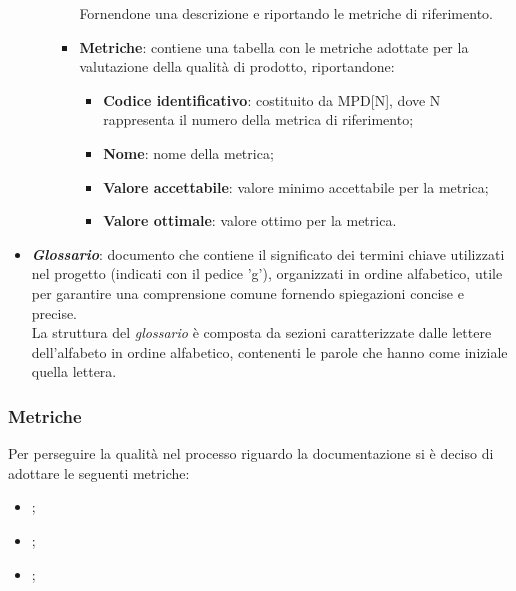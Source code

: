 \begin{itemize}
\begin{itemize}
\begin{itemize}
\begin{itemize}
                                                        \end{itemize}
                                                        Fornendone una descrizione e riportando le metriche di riferimento.
                                                        \item \textbf{Metriche}: contiene una tabella con le metriche adottate per la valutazione della qualità di prodotto, riportandone:
                                                        \begin{itemize}
                                                            \item \textbf{Codice identificativo}: costituito da MPD[N], dove N rappresenta il numero della metrica di riferimento;
                                                            \item \textbf{Nome}: nome della metrica;
                                                            \item \textbf{Valore accettabile}: valore minimo accettabile per la metrica;
                                                            \item \textbf{Valore ottimale}: valore ottimo per la metrica.
                                                        \end{itemize}
                                                    \end{itemize}
            \end{itemize}
            \item \textit{\textbf{Glossario}}: documento che contiene il significato dei termini chiave utilizzati nel progetto (indicati con il pedice 'g'), organizzati in ordine alfabetico, utile per garantire una comprensione comune fornendo spiegazioni concise e precise.
            \\La struttura del \textit{glossario} è composta da sezioni caratterizzate dalle lettere dell'alfabeto in ordine alfabetico, contenenti le parole che hanno come iniziale quella lettera.
        \end{itemize}

        \subsubsection{Metriche}
        Per perseguire la qualità nel processo riguardo la documentazione si è deciso di adottare le seguenti metriche:
        \begin{itemize}
                \item {};
                \item {};
                \item {};
        \end{itemize}

